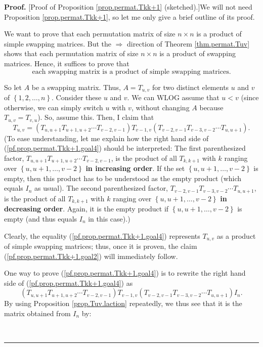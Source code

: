 \documentclass[numbers=enddot,12pt,final,onecolumn,notitlepage]{scrartcl}%
\theoremstyle{definition}
\newenvironment{proof}[1][Proof]{\noindent\textbf{#1.} }{\ \rule{0.5em}{0.5em}}
\begin{document}
\begin{proof}
[Proof of Proposition \ref{prop.permat.Tkk+1} (sketched).]We will not need
Proposition \ref{prop.permat.Tkk+1}, so let me only give a brief outline of
its proof.

We want to prove that each permutation matrix of size $n\times n$ is a product
of simple swapping matrices. But the $\Longrightarrow$ direction of Theorem
\ref{thm.permat.Tuv} shows that each permutation matrix of size $n\times n$ is
a product of swapping matrices. Hence, it suffices to prove that%
\begin{equation}
\text{each swapping matrix is a product of simple swapping matrices.}
\label{pf.prop.permat.Tkk+1.goal2}%
\end{equation}


So let $A$ be a swapping matrix. Thus, $A=T_{u,v}$ for two distinct elements
$u$ and $v$ of $\left\{  1,2,\ldots,n\right\}  $. Consider these $u$ and $v$.
We can WLOG assume that $u<v$ (since otherwise, we can simply switch $u$ with
$v$, without changing $A$ because $T_{u,v}=T_{v,u}$). So, assume this. Then, I
claim that%
\begin{equation}
T_{u,v}=\left(  T_{u,u+1}T_{u+1,u+2}\cdots T_{v-2,v-1}\right)  T_{v-1,v}%
\left(  T_{v-2,v-1}T_{v-3,v-2}\cdots T_{u,u+1}\right)  .
\label{pf.prop.permat.Tkk+1.goal4}%
\end{equation}
(To ease understanding, let me explain how the right hand side of
(\ref{pf.prop.permat.Tkk+1.goal4}) should be interpreted: The first
parenthesized factor, $T_{u,u+1}T_{u+1,u+2}\cdots T_{v-2,v-1}$, is the product
of all $T_{k,k+1}$ with $k$ ranging over $\left\{  u,u+1,\ldots,v-2\right\}  $
\textbf{in increasing order}. If the set $\left\{  u,u+1,\ldots,v-2\right\}  $
is empty, then this product has to be understood as the empty product (which
equals $I_{n}$ as usual). The second parenthesized factor, $T_{v-2,v-1}%
T_{v-3,v-2}\cdots T_{u,u+1}$, is the product of all $T_{k,k+1}$ with $k$
ranging over $\left\{  u,u+1,\ldots,v-2\right\}  $ \textbf{in decreasing
order}. Again, it is the empty product if $\left\{  u,u+1,\ldots,v-2\right\}
$ is empty (and thus equals $I_{n}$ in this case).)

Clearly, the equality (\ref{pf.prop.permat.Tkk+1.goal4}) represents $T_{u,v}$
as a product of simple swapping matrices; thus, once it is proven, the claim
(\ref{pf.prop.permat.Tkk+1.goal2}) will immediately follow.

One way to prove (\ref{pf.prop.permat.Tkk+1.goal4}) is to rewrite the right
hand side of (\ref{pf.prop.permat.Tkk+1.goal4}) as%
\begin{equation}
\left(  T_{u,u+1}T_{u+1,u+2}\cdots T_{v-2,v-1}\right)  T_{v-1,v}\left(
T_{v-2,v-1}T_{v-3,v-2}\cdots T_{u,u+1}\right)  I_{n}.
\label{pf.prop.permat.Tkk+1.RHS}%
\end{equation}
By using Proposition \ref{prop.Tuv.laction} repeatedly, we thus see that it is
the matrix obtained from $I_{n}$ by:


\end{proof}
\end{document}
